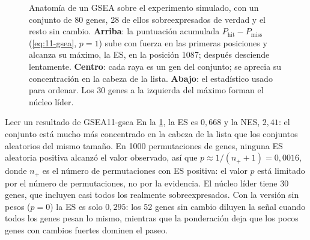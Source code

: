 \begin{figure}[!htb]
\centering

\caption[Paseo aleatorio de GSEA]{Anatomía de un GSEA sobre el experimento simulado, con un conjunto de 80 genes, 28 de ellos sobreexpresados de verdad y el resto sin cambio. \textbf{Arriba}: la puntuación acumulada $P_{\mathrm{hit}}-P_{\mathrm{miss}}$ (\cref{eq:11-gsea}, $p=1$) sube con fuerza en las primeras posiciones y alcanza su máximo, la ES, en la posición \num{1087}; después desciende lentamente. \textbf{Centro}: cada raya es un gen del conjunto; se aprecia su concentración en la cabeza de la lista. \textbf{Abajo}: el estadístico usado para ordenar. Los 30 genes a la izquierda del máximo forman el núcleo líder.}
\label{fig:11-gsea}
\end{figure}

\begin{ejemplo}{Leer un resultado de GSEA}{11-gsea}
En la \cref{fig:11-gsea}, la ES es $0{,}668$ y la NES, $2{,}41$: el conjunto está mucho más concentrado en la cabeza de la lista que los conjuntos aleatorios del mismo tamaño. En \num{1000} permutaciones de genes, ninguna ES aleatoria positiva alcanzó el valor observado, así que $p\approx1/(n_{+}+1)=0{,}0016$, donde $n_{+}$ es el número de permutaciones con ES positiva: el valor $p$ está limitado por el número de permutaciones, no por la evidencia. El núcleo líder tiene 30 genes, que incluyen casi todos los realmente sobreexpresados. Con la versión sin pesos ($p=0$) la ES es solo $0{,}295$: los 52 genes sin cambio diluyen la señal cuando todos los genes pesan lo mismo, mientras que la ponderación deja que los pocos genes con cambios fuertes dominen el paseo.
\end{ejemplo}

